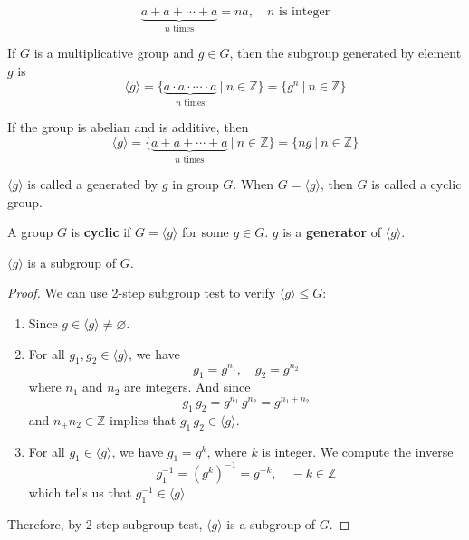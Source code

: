 \[
    \underbrace{a + a + \cdots + a}_{n \text{ times}} = na, \quad n \text{ is integer}
\]

\begin{definition}
    If $G$ is a multiplicative group and $g \in G$, then the subgroup generated by element $g$ is 
    \begin{equation}
        \langle g \rangle = \{ \underbrace{a \cdot a \cdot \cdots \cdot a}_{n \text{ times}} \> | \> n \in \mathbb{Z} \} = \{ g^n \> | \> n \in \mathbb{Z} \}
    \end{equation}

    If the group is abelian and is additive, then 
    \begin{equation}
        \langle g \rangle = \{ \underbrace{a + a + \cdots + a}_{n \text{ times}} \> | \> n \in \mathbb{Z} \}= \{ ng \> | \> n \in \mathbb{Z} \}
    \end{equation}
\end{definition}

\begin{remark}
    $\langle g \rangle$ is called a  generated by $g$ in group $G$. When $G = \langle g \rangle$, then $G$ is called 
    a cyclic group.
\end{remark}

\begin{definition}
    A group $G$ is \textbf{cyclic} if $G = \langle g \rangle$ for some $g \in G$. $g$ is a \textbf{generator} of $\langle g \rangle$.
\end{definition}

\begin{lemma}
    $\langle g \rangle$ is a subgroup of $G$.
\end{lemma}
\begin{proof}
    We can use 2-step subgroup test to verify $\langle g \rangle \leq G$:
    \begin{enumerate}
        \item Since $g \in \langle g \rangle \neq \varnothing$.
        \item For all $g_1, g_2 \in \langle g \rangle$, we have 
        \[
            g_1 = g^{n_1}, \quad g_2 = g^{n_2}
        \]
        where $n_1$ and $n_2$ are integers. And since 
        \[
            g_1\, g_2 = g^{n_1} \, g^{n_2} = g^{n_1 + n_2}
        \]
        and $n_ + n_2 \in \mathbb{Z}$ implies that $g_1 \, g_2 \in \langle g \rangle$.
        \item For all $g_1 \in \langle g \rangle$, we have $g_1 = g^{k}$, where $k$ is integer. We compute the inverse
        \[
            g_1^{-1} = (g^{k})^{-1} = g^{-k}, \quad -k \in \mathbb{Z}
        \]
        which tells us that $g^{-1}_1 \in \langle g \rangle$.
    \end{enumerate}

    Therefore, by 2-step subgroup test, $\langle g \rangle$ is a subgroup of $G$.
\end{proof}

